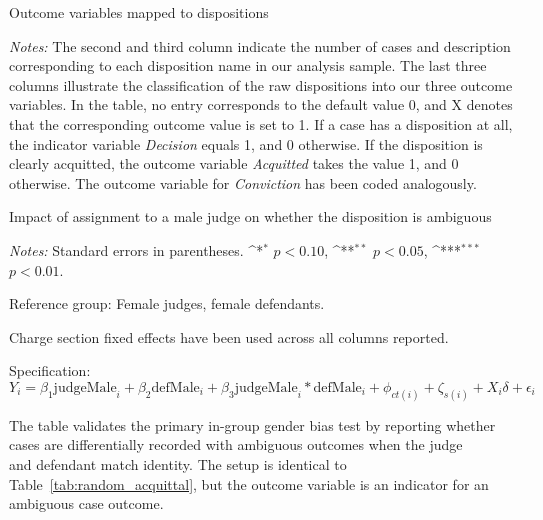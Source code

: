\documentclass[12pt,english]{article}
\def\sym#1{\ifmmode^{#1}\else\(^{#1}\)\fi}
\newcommand{\HOME}{\string~}
\newcommand{\curpath}{\HOME/ddl/justice-overleaf}
\newcommand{\curpath}{.}
\begin{document}
\begin{appendices}
\begin{landscape}
\begin{table}
\begin{center}
  \caption{Outcome variables mapped to dispositions}
  \label{tab:dispositions}
          \resizebox{0.9\linewidth}{!}{
  }
 \begin{minipage}{1.2\textwidth}
    {\scriptsize \emph{Notes:} 
    The second and third column indicate the number of cases and description corresponding to each disposition name in our analysis sample. The last three columns  illustrate the classification of the raw dispositions into our three outcome variables. In the table, no entry corresponds to the default value 0, and X denotes that the corresponding outcome value is set to 1. If a case has a disposition at all, the indicator variable \textit{Decision} equals 1, and 0 otherwise. If the disposition is clearly acquitted, the outcome variable \textit{Acquitted} takes the value 1, and 0 otherwise. The outcome variable for \textit{Conviction} has been coded analogously.\par}
 \end{minipage}
 \end{center}
\end{table}

\begin{table}
  \begin{center}
     \caption{Impact of assignment to a male judge on whether the disposition is ambiguous}
      \label{tab:robust_amb_female}
     
    \end{center}
    \begin{minipage}{1.6\textwidth}
        \footnotesize 
        \emph{Notes:} Standard errors in parentheses. \sym{*} \(p<0.10\), \sym{**} \(p<0.05\), \sym{***} \(p<0.01\).  \par 
        Reference group: Female judges, female defendants.  \par
        Charge section fixed effects have been used across all columns reported. \par
        Specification: $Y_{i} = \beta_{1} \text{judgeMale}_{i} + \beta_{2} \text{defMale}_{i} + \beta_{3} \text{judgeMale}_{i} * \text{defMale}_{i} + \phi_{ct(i)} + \zeta_{s(i)} + X_i \delta + \epsilon_{i}$ \par
        The table validates the primary in-group gender bias test by reporting whether cases are differentially recorded with ambiguous outcomes when the judge \\ and defendant match identity. The setup is identical to Table~\ref{tab:random_acquittal}, but the outcome variable is an indicator for an ambiguous case outcome.
   \end{minipage}
\end{table}


\end{landscape}
\end{appendices}
\end{document}
